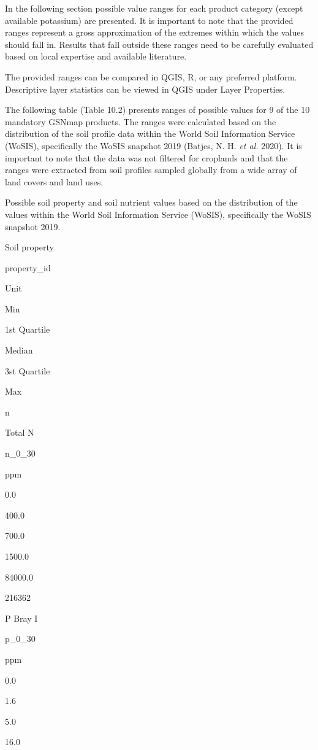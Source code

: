 \documentclass[
  10pt,
  b5paper,
  oneside]{book}
\begin{document}
In the following section possible value ranges for each product category (except available potassium) are presented. It is important to note that the provided ranges represent a gross approximation of the extremes within which the values should fall in. Results that fall outside these ranges need to be carefully evaluated based on local expertise and available literature.

The provided ranges can be compared in QGIS, R, or any preferred platform. Descriptive layer statistics can be viewed in QGIS under Layer Properties.

The following table (Table 10.2) presents ranges of possible values for 9 of the 10 mandatory GSNmap products. The ranges were calculated based on the distribution of the soil profile data within the World Soil Information Service (WoSIS), specifically the WoSIS snapshot 2019 (Batjes, N. H. \emph{et al.} 2020). It is important to note that the data was not filtered for croplands and that the ranges were extracted from soil profiles sampled globally from a wide array of land covers and land uses.

\label{tab:ranges}\label{tab:ranges}Possible soil property and soil nutrient values based on the distribution of the values within the World Soil Information Service (WoSIS), specifically the WoSIS snapshot 2019.

Soil property

property\_id

Unit

Min

1st Quartile

Median

3st Quartile

Max

n

Total N

n\_0\_30

ppm

0.0

400.0

700.0

1500.0

84000.0

216362

P Bray I

p\_0\_30

ppm

0.0

1.6

5.0

16.0
\end{document}
